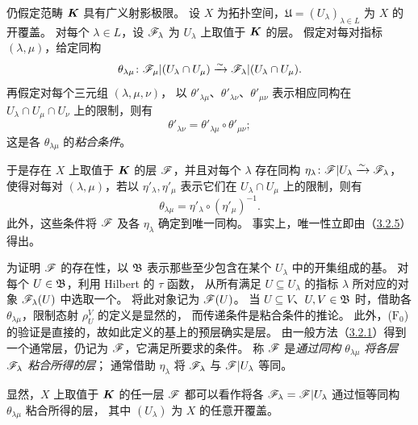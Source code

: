 仍假定范畴 $\boldsymbol K$ 具有广义射影极限。
设 $X$ 为拓扑空间，$\mathfrak U=(U_\lambda)_{\lambda\in L}$ 为 $X$ 的开覆盖。
对每个 $\lambda\in L$，设 $\mathscr F_\lambda$ 为 $U_\lambda$ 上取值于 $\boldsymbol K$ 的层。
假定对每对指标 $(\lambda,\mu)$，给定同构
\[
 \theta_{\lambda\mu}\colon
 \mathscr F_\mu|(U_\lambda\cap U_\mu)
 \xrightarrow{\sim}
 \mathscr F_\lambda|(U_\lambda\cap U_\mu).
\]
再假定对每个三元组 $(\lambda,\mu,\nu)$，
以 $\theta'_{\lambda\mu}$、$\theta'_{\lambda\nu}$、$\theta'_{\mu\nu}$
表示相应同构在 $U_\lambda\cap U_\mu\cap U_\nu$ 上的限制，则有
\[
 \theta'_{\lambda\nu}=\theta'_{\lambda\mu}\circ\theta'_{\mu\nu};
\]
这是各 $\theta_{\lambda\mu}$ 的\emph{粘合条件}。

于是存在 $X$ 上取值于 $\boldsymbol K$ 的层 $\mathscr F$，并且对每个 $\lambda$ 存在同构
$\eta_\lambda\colon\mathscr F|U_\lambda\xrightarrow{\sim}\mathscr F_\lambda$，
使得对每对 $(\lambda,\mu)$，若以 $\eta'_\lambda,\eta'_\mu$ 表示它们在
$U_\lambda\cap U_\mu$ 上的限制，则有
\[
 \theta_{\lambda\mu}=\eta'_\lambda\circ(\eta'_\mu)^{-1}.
\]
此外，这些条件将 $\mathscr F$ 及各 $\eta_\lambda$ 确定到唯一同构。
事实上，唯一性立即由（\hyperlink{para:0:3.2.5}{3.2.5}）得出。

为证明 $\mathscr F$ 的存在性，以 $\mathfrak B$ 表示那些至少包含在某个 $U_\lambda$ 中的开集组成的基。
对每个 $U\in\mathfrak B$，利用 Hilbert 的 $\tau$ 函数，
从所有满足 $U\subseteq U_\lambda$ 的指标 $\lambda$ 所对应的对象 $\mathscr F_\lambda(U)$ 中选取一个。
将此对象记为 $\mathscr F(U)$。
当 $U\subseteq V$、$U,V\in\mathfrak B$ 时，借助各 $\theta_{\lambda\mu}$，限制态射 $\rho_U^V$ 的定义是显然的，
而传递条件是粘合条件的推论。
此外，($\mathrm F_0$) 的验证是直接的，故如此定义的基上的预层确实是层。
由一般方法（\hyperlink{para:0:3.2.1}{3.2.1}）得到一个通常层，仍记为 $\mathscr F$，它满足所要求的条件。
称 $\mathscr F$ 是\emph{通过同构 $\theta_{\lambda\mu}$ 将各层 $\mathscr F_\lambda$ 粘合所得的层}；
通常借助 $\eta_\lambda$ 将 $\mathscr F_\lambda$ 与 $\mathscr F|U_\lambda$ 等同。

显然，$X$ 上取值于 $\boldsymbol K$ 的任一层 $\mathscr F$ 都可以看作将各
$\mathscr F_\lambda=\mathscr F|U_\lambda$ 通过恒等同构 $\theta_{\lambda\mu}$ 粘合所得的层，
其中 $(U_\lambda)$ 为 $X$ 的任意开覆盖。


